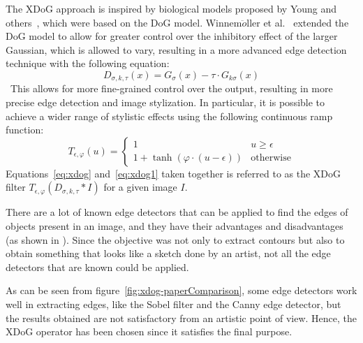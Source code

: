 \noindent The XDoG approach is inspired by biological models proposed by Young and others~\cite{GaussianDerivativeModel}, which were based on the DoG model. Winnem$\ddot o$ller et al.~\cite{RealTimeVideoAbstraction} extended the DoG model to allow for greater control over the inhibitory effect of the larger Gaussian, which is allowed to vary, resulting in a more advanced edge detection technique with the following equation:
\begin{equation}
    D_{\sigma, k,\tau}(x)=G_{\sigma}(x)-\tau \cdot G_{k\sigma}(x)
    \label{eq:xdog}
\end{equation}
 This allows for more fine-grained control over the output, resulting in more precise edge detection and image stylization. In particular, it is possible to achieve a wider range of stylistic effects using the following continuous ramp function:
 \begin{equation}
     T_{\epsilon, \varphi}(u) = 
     \begin{cases}
        1 & u \ge \epsilon \\
        1+ \tanh (\varphi \cdot (u-\epsilon)) & \mbox{otherwise}
    \end{cases}
\label{eq:xdog1}
 \end{equation}
Equations~\ref{eq:xdog} and~\ref{eq:xdog1} taken together is referred to as the XDoG filter $T_{\epsilon, \varphi}(D_{\sigma, k, \tau }*I)$ for a given image $I$. 

\noindent There are a lot of known edge detectors that can be applied to find the edges of objects present in an image, and they have their advantages and disadvantages (as shown in \cite{xdog}). Since the objective was not only to extract contours but also to obtain something that looks like a sketch done by an artist, not all the edge detectors that are known could be applied. 

\noindent As can be seen from figure~\ref{fig:xdog-paperComparison}, some edge detectors work well in extracting edges, like the Sobel filter and the Canny edge detector, but the results obtained are not satisfactory from an artistic point of view. Hence, the XDoG operator has been chosen since it satisfies the final purpose.

